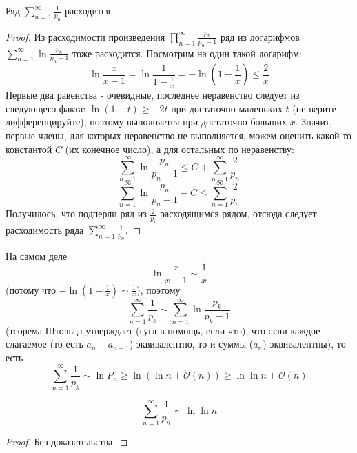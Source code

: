 \begin{theorem} \thmslashn
  
  Ряд $\sum\limits_{n=1}^\infty\frac{1}{p_n}$ расходится
  \begin{proof} \thmslashn

    Из расходимости произведения $\prod\limits_{n=1}^\infty\frac{p_n}{p_n-1}$ ряд из логарифмов $\sum\limits_{n=1}^\infty\ln\frac{p_n}{p_n-1}$ тоже расходится. Посмотрим на один такой логарифм:
    $$\ln\frac{x}{x-1} =  \ln\frac{1}{1-\frac{1}{x}} = -\ln\left(1-\frac{1}{x}\right) \leqslant \frac{2}{x}$$
    Первые два равенства - очевидные, последнее неравенство следует из следующего факта: $\ln(1-t)\geqslant-2t$ при достаточно маленьких $t$ (не верите - дифференцируйте), поэтому выполняется при достаточно больших $x$. Значит, первые члены, для которых неравенство не выполняется, можем оценить какой-то константой $C$ (их конечное число), а для остальных по неравенству:
    $$\sum_{n=1}^\infty \ln \frac{p_n}{p_n -1}\leqslant C + \sum_{n=1}^\infty\frac{2}{p_n}$$
    $$\sum_{n=1}^\infty \ln \frac{p_n}{p_n -1} - C\leqslant \sum_{n=1}^\infty\frac{2}{p_n}$$
    Получилось, что подперли ряд из $\frac{2}{p_i}$ расходящимся рядом, отсюда следует расходимость ряда $\sum\limits_{n=1}^\infty\frac{1}{p_n}$.
  \end{proof}
  \begin{remark} \thmslashn

    На самом деле
    $$\ln\frac{x}{x-1} \sim \frac{1}{x}$$
    (потому что $-\ln\left(1 - \frac{1}{x}\right) \sim \frac{1}{x}$), поэтому
    $$\sum\limits_{n=1}^\infty\frac{1}{p_k} \sim \sum\limits_{n=1}^\infty \ln\frac{p_k}{p_k - 1}$$
    (теорема Штольца утверждает (гугл в помощь, если что), что если каждое слагаемое (то есть $a_n - a_{n-1}$) эквивалентно, то и суммы ($a_n$) эквивалентны), то есть
    $$\sum\limits_{n=1}^\infty\frac{1}{p_k} \sim \ln P_n \geqslant \ln(\ln n + \mathcal{O}(n)) \geqslant \ln\ln n + \mathcal{O}(n)$$
    \begin{statement} \thmslashn

      $$\sum_{n=1}^\infty\frac{1}{p_n} \sim \ln\ln n$$
      \begin{proof} \thmslashn

        Без доказательства.
      \end{proof}
    \end{statement}
  \end{remark}
\end{theorem}
